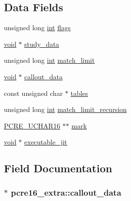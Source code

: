 \subsection*{Data Fields}
\begin{DoxyCompactItemize}
\item 
unsigned long \hyperlink{pcre_8txt_a42dfa4ff673c82d8efe7144098fbc198}{int} \hyperlink{structpcre16__extra_aae98750210cd8fd99d00ad7b92c02f62}{flags}
\item 
\hyperlink{group__MOD__ISAPI_gacd6cdbf73df3d9eed42fa493d9b621a6}{void} $\ast$ \hyperlink{structpcre16__extra_aec36980135877dc589e960145408d5a2}{study\+\_\+data}
\item 
unsigned long \hyperlink{pcre_8txt_a42dfa4ff673c82d8efe7144098fbc198}{int} \hyperlink{structpcre16__extra_ac00b845a071e8ba16d06cac54078b096}{match\+\_\+limit}
\item 
\hyperlink{group__MOD__ISAPI_gacd6cdbf73df3d9eed42fa493d9b621a6}{void} $\ast$ \hyperlink{structpcre16__extra_a540b8cdd0f2a907c333819a787ad0984}{callout\+\_\+data}
\item 
const unsigned char $\ast$ \hyperlink{structpcre16__extra_acb2e6cb1effab8fcaec3f3cc06b163b2}{tables}
\item 
unsigned long \hyperlink{pcre_8txt_a42dfa4ff673c82d8efe7144098fbc198}{int} \hyperlink{structpcre16__extra_a271e8501fa0b0f5837ed5d9a3244c78b}{match\+\_\+limit\+\_\+recursion}
\item 
\hyperlink{pcre_8h_ad66b7fbc6977c60c64bdb4ba9da599aa}{P\+C\+R\+E\+\_\+\+U\+C\+H\+A\+R16} $\ast$$\ast$ \hyperlink{structpcre16__extra_a510cc828d8c06aa14d22b5743d2df5f7}{mark}
\item 
\hyperlink{group__MOD__ISAPI_gacd6cdbf73df3d9eed42fa493d9b621a6}{void} $\ast$ \hyperlink{structpcre16__extra_ab0200b2bd6d0ad1dbe7255505e818f1b}{executable\+\_\+jit}
\end{DoxyCompactItemize}


\subsection{Field Documentation}
\subsubsection[{\texorpdfstring{callout\+\_\+data}{callout_data}}]{$\ast$ pcre16\+\_\+extra\+::callout\+\_\+data}\hypertarget{structpcre16__extra_a540b8cdd0f2a907c333819a787ad0984}{}\label{structpcre16__extra_a540b8cdd0f2a907c333819a787ad0984}

